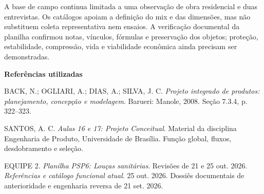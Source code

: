 A base de campo continua limitada a uma observação de obra residencial e duas entrevistas. Os catálogos apoiam a definição do mix e das dimensões, mas não substituem coleta representativa nem ensaios. A verificação documental da planilha confirmou notas, vínculos, fórmulas e preservação dos objetos; proteção, estabilidade, compressão, vida e viabilidade econômica ainda precisam ser demonstradas.

\vspace{4pt}
\noindent\textbf{Referências utilizadas}\par
\begin{singlespace}\footnotesize\setlength{\parindent}{0pt}\setlength{\parskip}{3pt}
BACK, N.; OGLIARI, A.; DIAS, A.; SILVA, J. C. \textit{Projeto integrado de produtos: planejamento, concepção e modelagem}. Barueri: Manole, 2008. Seção 7.3.4, p. 322--323.

SANTOS, A. C. \textit{Aulas 16 e 17: Projeto Conceitual}. Material da disciplina Engenharia de Produto, Universidade de Brasília. Função global, fluxos, desdobramento e seleção.

EQUIPE 2. \textit{Planilha PSP6: Louças sanitárias}. Revisões de 21 e 25 out. 2026. \textit{Referências e catálogo funcional atual}. 25 out. 2026. Dossiês documentais de anterioridade e engenharia reversa de 21 set. 2026.
\end{singlespace}
